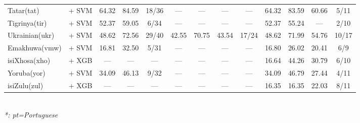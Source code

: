 \begin{table*}[h]
{\begin{tabular}{l|c|ccc|cccc|cccc}
            Tatar(tat)           & \citep{wang2024multilingual}    + SVM                                  & 64.32                        & 84.59                        & 18/36                       & —             & —             & —                 & —             & 64.32         & 83.59         & 60.66             & 5/11          \\
            Tigrinya(tir)        & \citep{wang2024multilingual}    + SVM                                  & 52.37                        & 59.05                        & 6/34                        & —             & —             & —                 & —             & 52.37         & 55.24         & —                 & 2/10          \\
            Ukrainian(ukr)       & \citep{sturua2024jinaembeddingsv3multilingualembeddingstask}   + SVM   & 48.62                        & 72.56                        & 29/40                       & 42.55         & 70.75         & 43.54             & 17/24         & 48.62         & 71.99         & 54.76             & 10/17         \\
            Emakhuwa(vmw)        & \citep{sturua2024jinaembeddingsv3multilingualembeddingstask}   + SVM   & 16.81                        & 32.50                        & 5/31                        & —             & —             & —                 & —             & 16.80         & 26.02         & 20.41             & 6/9           \\
            isiXhosa(xho)        & \citep{wang2024multilingual}     + XGB                                 & —                            & —                            & —                           & —             & —             & —                 & —             & 16.64         & 44.26         & 30.79             & 6/10          \\
            Yoruba(yor)          & \citep{wang2024multilingual}     + SVM                                 & 34.09                        & 46.13                        & 9/32                        & —             & —             & —                 & —             & 34.09         & 46.79         & 27.44             & 4/11          \\
            isiZulu(zul)         & \citep{wang2024multilingual}     + XGB                                 & —                            & —                            & —                           & —             & —             & —                 & —             & 16.35         & 16.35         & 22.03             & 8/11          \\
            \hline
        \end{tabular}
    }
    \\
    \footnotesize{\textit{*: pt=Portuguese}}
\end{table*}
